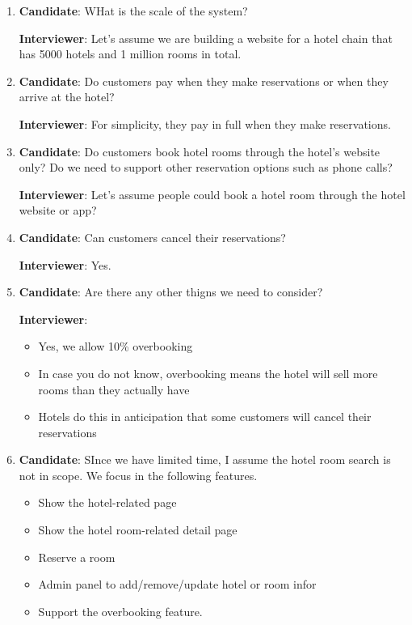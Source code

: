 \documentclass{report}
\theoremstyle{definition}
\begin{document}
\begin{enumerate}
\item
\textbf{Candidate}: WHat is the scale of the system?

\textbf{Interviewer}: Let's assume we are building a website for a hotel chain that has 5000 hotels and 1 million rooms in total.

\item
\textbf{Candidate}: Do customers pay when they make reservations or when they arrive at the hotel?

\textbf{Interviewer}: For simplicity, they pay in full when they make reservations.
\item
\textbf{Candidate}: Do customers book hotel rooms through the hotel's website only? Do we need to support other reservation options such as phone calls?

\textbf{Interviewer}: Let's assume people could book a hotel room through the hotel website or app?

\item
\textbf{Candidate}: Can customers cancel their reservations?

\textbf{Interviewer}: Yes.

\item
\textbf{Candidate}: Are there any other thigns we need to consider?

\textbf{Interviewer}:
\begin{itemize}
\item
Yes, we allow 10\% overbooking
\item
In case you do not know, overbooking means the hotel will sell more rooms than they actually have
\item
Hotels do this in anticipation that some customers will cancel their reservations
\end{itemize}

\item

\textbf{Candidate}: SInce we have limited time, I assume the hotel room search is not in scope. We focus in the following features.

\begin{itemize}
\item
Show the hotel-related page
\item
Show the hotel room-related detail page
\item
Reserve a room
\item
Admin panel to add/remove/update hotel or room infor
\item
Support the overbooking feature.
\end{itemize}


\end{enumerate}
\end{document}
